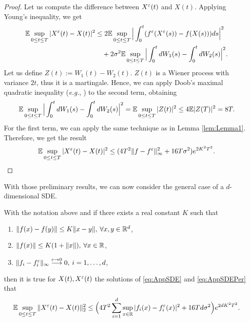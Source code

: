 \begin{proof} Let us compute the difference between $X^\varepsilon(t)$ and $X(t)$. Applying Young's inequality, we get
\begin{equation*}
\begin{aligned}
	\mathbb{E} \sup_{0 \leq t \leq T} |X^\varepsilon(t) - X(t)|^2 &\leq 2\mathbb{E} \sup_{0 \leq t \leq T}\Big|\int_0^t (f^\varepsilon (X^\varepsilon(s)) - f(X(s)))ds \Big|^2 \\
		&\quad + 2\sigma^2 \mathbb{E} \sup_{0 \leq t \leq T} \Big|\int_0^t dW_1(s) - \int_0^t dW_2(s)  \Big|^2.
\end{aligned}
\end{equation*}
Let us define $Z(t) := W_1(t) - W_2(t)$. $Z(t)$ is a Wiener process with variance $2t$, thus it is a martingale. Hence, we can apply Doob's maximal quadratic inequality (\textit{e.g.}, \cite[Page 11]{Protter2004}) to the second term, obtaining
\begin{equation*}
	\mathbb{E} \sup_{0 \leq t \leq T} \Big|\int_0^t dW_1(s) - \int_0^t dW_2(s)  \Big|^2 = \mathbb{E} \sup_{0 \leq t \leq T} | Z(t) |^2 \leq 4 \mathbb{E} |Z(T)|^2 = 8T.
\end{equation*}
For the first term, we can apply the same technique as in Lemma \ref{lem:Lemma1}. Therefore, we get the result
\begin{equation*}
	\mathbb{E} \sup_{0 \leq t \leq T} |X^\varepsilon(t) - X(t)|^2 \leq (4T^2 \|f - f^\varepsilon\|_{\infty}^2 + 16T\sigma^2) e^{2K^2T^2}.
\end{equation*}
\end{proof}
\noindent With those preliminary results, we can now consider the general case of a $d$-dimensional SDE.
\begin{theorem}\label{th:Prop} With the notation above and if there exists a real constant $K$ such that
\begin{enumerate}
	\item $\|f(x) - f(y)\| \leq K\|x - y\|, \: \forall x,y \in \mathbb{R}^d$,
	\item $\|f(x)\| \leq K(1 + \|x\|), \: \forall x \in \mathbb{R}$,
 	\item $\|f_i - f_i^\varepsilon\|_\infty \stackrel{\varepsilon \rightarrow 0}\longrightarrow 0, \: i = 1, \dots, d$,
\end{enumerate}
then it is true for $X(t), X^\varepsilon(t)$ the solutions of \eqref{eq:AppSDE} and \eqref{eq:AppSDEPer} that 
\begin{equation}\label{eq:Proposition}
	\mathbb{E} \sup_{0\leq t\leq T} \| X^\varepsilon(t) - X(t) \|_2^2 \leq \Big(4T^2 \sum_{i=1}^d \sup_{x\in \mathbb{R}}|f_i(x) - f_i^\varepsilon(x)|^2 + 16Td\sigma^2\Big)e^{2dK^2T^2}.
\end{equation}
\end{theorem}
